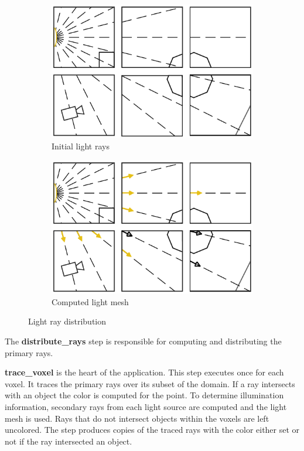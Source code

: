 \begin{figure}[!htb]
\centering
\begin{subfigure}{0.49\textwidth}
 \centering
  \includegraphics[width=.98\columnwidth]{drawings/Lights1.pdf}
  \caption{Initial light rays}
\end{subfigure}
\begin{subfigure}{0.49\textwidth}
 \centering
  \includegraphics[width=.98\columnwidth]{drawings/Lights2.pdf}
  \caption{Computed light mesh}
\end{subfigure}
\caption{Light ray distribution}
\label{fig:light2}
\end{figure}

The \textbf{distribute\_rays} step is responsible for computing and distributing
the primary rays. 

\textbf{trace\_voxel} is the heart of the application. This step executes once 
for each voxel.  It traces the primary rays over its subset of the domain. If a 
ray intersects with an object the color is computed for the point. To determine 
illumination information, secondary rays from each light source are computed and 
the light mesh is used.  Rays that do not intersect objects within the voxels 
are left uncolored.  The step produces copies of the traced rays with the color 
either set or not if the ray intersected an object.


